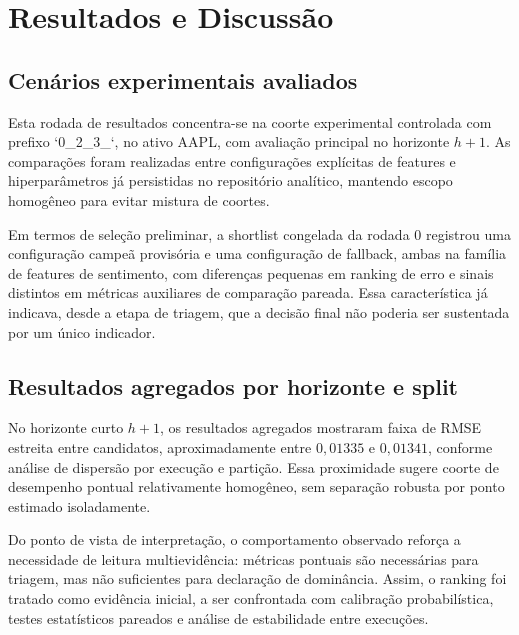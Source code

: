 \chapter{Resultados e Discussão}


\section{Cenários experimentais avaliados}
Esta rodada de resultados concentra-se na coorte experimental controlada com prefixo `0\_2\_3\_`, no ativo AAPL, com avaliação principal no horizonte \(h+1\). As comparações foram realizadas entre configurações explícitas de features e hiperparâmetros já persistidas no repositório analítico, mantendo escopo homogêneo para evitar mistura de coortes.

Em termos de seleção preliminar, a shortlist congelada da rodada 0 registrou uma configuração campeã provisória e uma configuração de fallback, ambas na família de features de sentimento, com diferenças pequenas em ranking de erro e sinais distintos em métricas auxiliares de comparação pareada. Essa característica já indicava, desde a etapa de triagem, que a decisão final não poderia ser sustentada por um único indicador.

\section{Resultados agregados por horizonte e split}
No horizonte curto \(h+1\), os resultados agregados mostraram faixa de RMSE estreita entre candidatos, aproximadamente entre \(0{,}01335\) e \(0{,}01341\), conforme análise de dispersão por execução e partição. Essa proximidade sugere coorte de desempenho pontual relativamente homogêneo, sem separação robusta por ponto estimado isoladamente.

Do ponto de vista de interpretação, o comportamento observado reforça a necessidade de leitura multievidência: métricas pontuais são necessárias para triagem, mas não suficientes para declaração de dominância. Assim, o ranking foi tratado como evidência inicial, a ser confrontada com calibração probabilística, testes estatísticos pareados e análise de estabilidade entre execuções.

